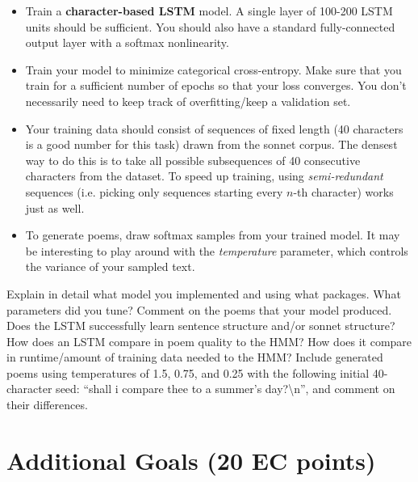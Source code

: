 \begin{itemize}
\item Train a \textbf{character-based LSTM} model. A single layer of 100-200 LSTM units should be sufficient. You should also have a standard fully-connected output layer with a softmax nonlinearity.

\item Train your model to minimize categorical cross-entropy. Make sure that you train for a sufficient number of epochs so that your loss converges. You don't necessarily need to keep track of overfitting/keep a validation set.

\item Your training data should consist of sequences of fixed length (40 characters is a good number for this task) drawn from the sonnet corpus. The densest way to do this is to take all possible subsequences of 40 consecutive characters from the dataset. To speed up training, using \emph{semi-redundant} sequences (i.e. picking only sequences starting every $n$-th character) works just as well.

\item To generate poems, draw softmax samples from your trained model. It may be interesting to play around with the \emph{temperature} parameter, which controls the variance of your sampled text.
\end{itemize}



\begin{report}
    Explain in detail what model you implemented and using what packages. What parameters did you tune? Comment on the poems that your model produced. Does the LSTM successfully learn sentence structure and/or sonnet structure? How does an LSTM compare in poem quality to the HMM? How does it compare in runtime/amount of training data needed to the HMM? Include generated poems using temperatures of 1.5, 0.75, and 0.25 with the following initial 40-character seed: ``shall i compare thee to a summer's day?\textbackslash n'', and comment on their differences.
\end{report}

\section{Additional Goals (20 EC points)}


